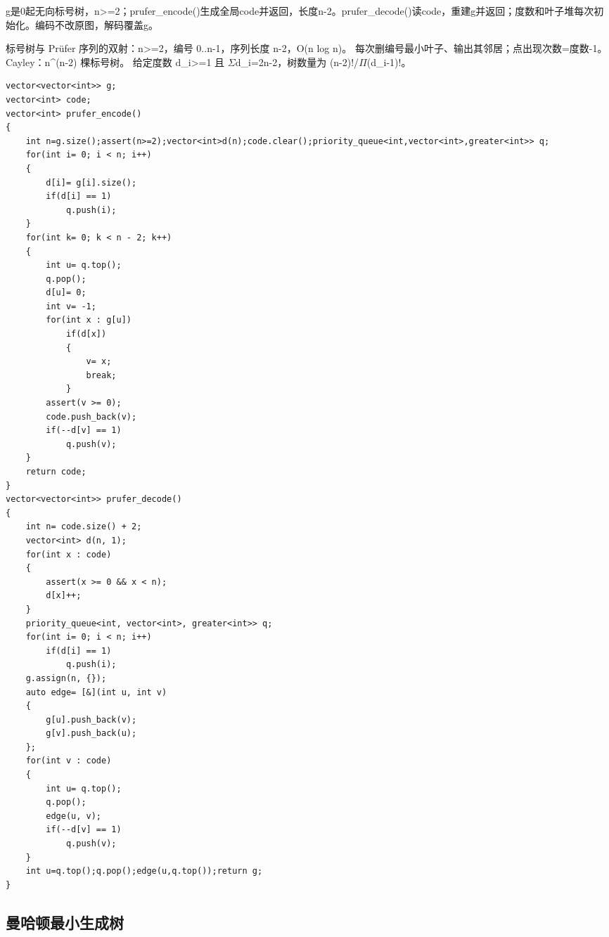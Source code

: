\documentclass[UTF8,fontset=fandol,a4paper,twoside]{ctexart}
\newcommand{\note}[1]{{\fontsize{10}{12}\selectfont #1\par}}
\begin{document}
\begin{multicols}{2}
\note{g是0起无向标号树，n>\allowbreak{}=\allowbreak{}2；prufer\_encode(\allowbreak{})\allowbreak{}生成全局code并返回，长度n-\allowbreak{}2。prufer\_decode(\allowbreak{})\allowbreak{}读code，重建g并返回；度数和叶子堆每次初始化。编码不改原图，解码覆盖g。}
\note{标号树与 Prüfer 序列的双射：n>\allowbreak{}=\allowbreak{}2，编号 0.\allowbreak{}.\allowbreak{}n-\allowbreak{}1，序列长度 n-\allowbreak{}2，O(\allowbreak{}n log n)\allowbreak{}。 每次删编号最小叶子、输出其邻居；点出现次数=\allowbreak{}度数-\allowbreak{}1。Cayley：n\textasciicircum{}(\allowbreak{}n-\allowbreak{}2)\allowbreak{} 棵标号树。 给定度数 d\_i>\allowbreak{}=\allowbreak{}1 且 \ensuremath{\Sigma}d\_i=\allowbreak{}2n-\allowbreak{}2，树数量为 (\allowbreak{}n-\allowbreak{}2)\allowbreak{}!/\allowbreak{}\ensuremath{\Pi}(\allowbreak{}d\_i-\allowbreak{}1)\allowbreak{}!。}
\begin{lstlisting}
vector<vector<int>> g;
vector<int> code;
vector<int> prufer_encode()
{
    int n=g.size();assert(n>=2);vector<int>d(n);code.clear();priority_queue<int,vector<int>,greater<int>> q;
    for(int i= 0; i < n; i++)
    {
        d[i]= g[i].size();
        if(d[i] == 1)
            q.push(i);
    }
    for(int k= 0; k < n - 2; k++)
    {
        int u= q.top();
        q.pop();
        d[u]= 0;
        int v= -1;
        for(int x : g[u])
            if(d[x])
            {
                v= x;
                break;
            }
        assert(v >= 0);
        code.push_back(v);
        if(--d[v] == 1)
            q.push(v);
    }
    return code;
}
vector<vector<int>> prufer_decode()
{
    int n= code.size() + 2;
    vector<int> d(n, 1);
    for(int x : code)
    {
        assert(x >= 0 && x < n);
        d[x]++;
    }
    priority_queue<int, vector<int>, greater<int>> q;
    for(int i= 0; i < n; i++)
        if(d[i] == 1)
            q.push(i);
    g.assign(n, {});
    auto edge= [&](int u, int v)
    {
        g[u].push_back(v);
        g[v].push_back(u);
    };
    for(int v : code)
    {
        int u= q.top();
        q.pop();
        edge(u, v);
        if(--d[v] == 1)
            q.push(v);
    }
    int u=q.top();q.pop();edge(u,q.top());return g;
}
\end{lstlisting}
\subsection{曼哈顿最小生成树}


\end{multicols}
\end{document}
